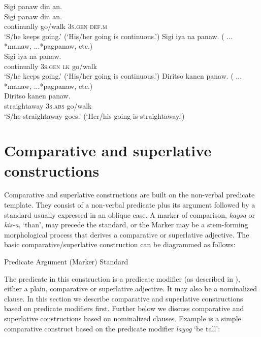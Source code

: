 \ea
\label{bkm:Ref329934414}
Sigi  panaw  din  an. \\\smallskip \gll Sigi  panaw  din  an. \\
continually  go/walk  \textsc{3}\textsc{s.gen}  \textsc{def.m} \\
\glt `S/he keeps going.’ (‘His/her going is continuous.’)
\z
\ea
Sigi  iya  na  panaw.  ( ... *manaw, ...*pagpanaw, etc.) \\\smallskip \gll Sigi  iya  na  panaw. \\
continually  \textsc{3}\textsc{s.gen}  \textsc{lk}  go/walk \\
\glt ‘S/he keeps going.’ (‘His/her going is continuous.’)
\z
\ea
\label{ex:straightaway}
Diritso  kanen  panaw. ( ... *manaw, ...*pagpanaw, etc.)  \\\smallskip \gll Diritso  kanen  panaw. \\
straightaway  \textsc{3}\textsc{s.abs}  go/walk \\
\glt ‘S/he straightaway goes.' (`Her/his going is straightaway.')
\z

\section{Comparative and superlative constructions} 
\label{sec:comparativesuperlativeclauses} 

Comparative and superlative constructions are built on the non-verbal predicate template. They consist of a non-verbal predicate plus its argument followed by a standard usually expressed in an oblique case. A marker of comparison, \textit{kaysa} or \textit{kis-a}, ‘than’, may precede the standard, or the Marker may be a stem-forming morphological process that derives a comparative or superlative adjective. The basic comparative/superlative construction can be diagrammed as follows:

\ea
   Predicate Argument (Marker) Standard
\z

The predicate in this construction is a predicate modifier (as described in ), either a plain, comparative or superlative adjective. It may also be a nominalized clause.  In this section we describe comparative and superlative constructions based on predicate modifiers first. Further below we discuss comparative and superlative constructions based on nominalized clauses. Example  is a simple comparative construct based on the predicate modifier \textit{layog} ‘be tall’:

